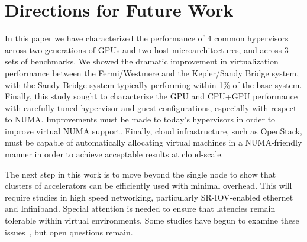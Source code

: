 \section{Directions for Future Work}\label{FUTURE}
In this paper we have characterized the performance of 4 common hypervisors
across two generations of GPUs and two host microarchitectures, and across 3
sets of benchmarks.  We showed the dramatic improvement in virtualization
performance between the Fermi/Westmere and the Kepler/Sandy Bridge system, with
the Sandy Bridge system typically performing within 1\% of the base system.
Finally, this study sought to characterize the GPU and CPU+GPU performance with
carefully tuned hypervisor and guest configurations, especially with respect to
NUMA.  Improvements must be made to today's hypervisors in order
to improve virtual NUMA support. Finally, cloud infrastructure, such as OpenStack, must be capable
of automatically allocating virtual machines in a NUMA-friendly manner in order
to achieve acceptable results at cloud-scale.


The next step in this work is to move beyond the single node to show that
clusters of accelerators can be efficiently used with minimal overhead.  This
will require studies in high speed networking, particularly SR-IOV-enabled 
ethernet and Infiniband.  Special attention is needed to ensure that
latencies remain tolerable within virtual environments.  Some studies have begun
to examine these issues~\cite{SRIOVInfiniband}, but open questions remain.









